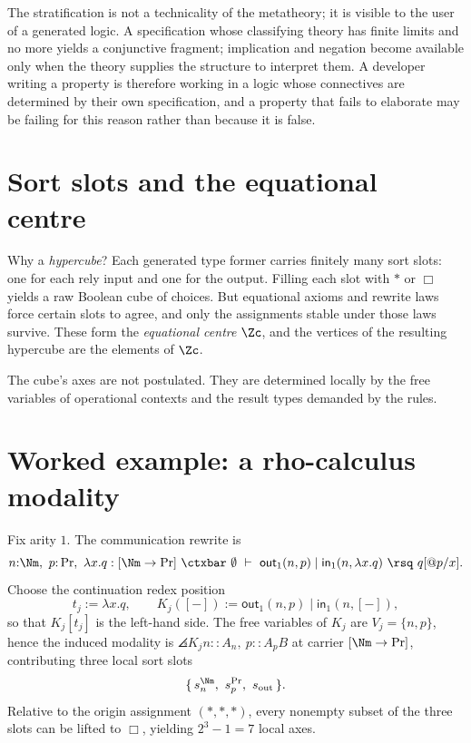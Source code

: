 \begin{remark}
\label{ob:rem:stratification}
The stratification is not a technicality of the metatheory; it is visible to the user of
a generated logic. A specification whose classifying theory has finite limits and no more
yields a conjunctive fragment; implication and negation become available only when the
theory supplies the structure to interpret them. A developer writing a property is
therefore working in a logic whose connectives are determined by their own specification,
and a property that fails to elaborate may be failing for this reason rather than because
it is false.
\end{remark}

\section{Sort slots and the equational centre}

Why a \emph{hypercube}? Each generated type former carries finitely many sort slots: one
for each rely input and one for the output. Filling each slot with $\ast$ or $\Box$ yields
a raw Boolean cube of choices. But equational axioms and rewrite laws force certain slots
to agree, and only the assignments stable under those laws survive. These form the
\emph{equational centre} $\Zc$, and the vertices of the resulting hypercube are the
elements of $\Zc$.

The cube's axes are not postulated. They are determined locally by the free variables of
operational contexts and the result types demanded by the rules.

\section{Worked example: a rho-calculus modality}
\label{ob:subsec:rho-modality}

Fix arity $1$. The communication rewrite is
\[
  n{:}\Nm,\ p{:}\Pr,\ \lambda x.q : [\Nm \to \Pr] \ \ctxbar\ \emptyset \ \vdash\
  \mathsf{out}_1(n,p) \mid \mathsf{in}_1(n, \lambda x.q) \ \rsq\ q[@p/x] .
\]
Choose the continuation redex position
\[
  t_j := \lambda x.q, \qquad K_j([-]) := \mathsf{out}_1(n,p) \mid \mathsf{in}_1(n,[-]) ,
\]
so that $K_j[t_j]$ is the left-hand side. The free variables of $K_j$ are
$V_j = \{n,p\}$, hence the induced modality is $\angles{K_j}{n :: A_n,\ p :: A_p}{B}$ at
carrier $[\Nm \to \Pr]$, contributing three local sort slots
\[
  \{\, s_n^{\Nm},\ s_p^{\Pr},\ s_{\mathrm{out}} \,\} .
\]
Relative to the origin assignment $(\ast,\ast,\ast)$, every nonempty subset of the three
slots can be lifted to $\Box$, yielding $2^3 - 1 = 7$ local axes.

